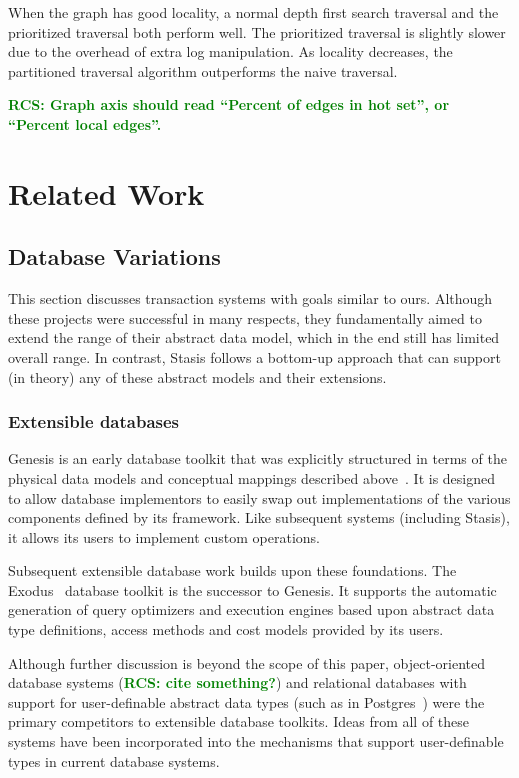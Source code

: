 \documentclass[letterpaper,twocolumn,10pt]{article}
\newcommand{\yad}{Stasis\xspace}
\newcommand{\rcs}[1]{\textcolor{green}{\bf RCS: #1}}
\begin{document}
When the graph has good locality, a normal depth first search
traversal and the prioritized traversal both perform well.  The
prioritized traversal is slightly slower due to the overhead of extra
log manipulation. As locality decreases, the partitioned traversal
algorithm outperforms the naive traversal.

\rcs{Graph axis should read ``Percent of edges in hot set'', or
``Percent local edges''.}

\section{Related Work}
\label{related-work}

\subsection{Database Variations} 
\label{sec:otherDBs}

This section discusses transaction systems with goals
similar to ours.  Although these projects were successful in many
respects, they fundamentally aimed to extend the range of their
abstract data model, which in the end still has limited overall range.
In contrast, \yad follows a bottom-up approach that can support (in 
theory) any of these abstract models and their extensions.

\subsubsection{Extensible databases}

Genesis is an early database toolkit that was explicitly
structured in terms of the physical data models and conceptual 
mappings described above~\cite{genesis}.
It is designed to allow database implementors to easily swap out
implementations of the various components defined by its framework.
Like subsequent systems (including \yad), it allows its users to
implement custom operations.

Subsequent extensible database work builds upon these foundations.
The Exodus~\cite{exodus} database toolkit is the successor to
Genesis. It supports the automatic generation of query optimizers and
execution engines based upon abstract data type definitions, access
methods and cost models provided by its users.

Although further discussion is beyond the scope of this paper,
object-oriented database systems (\rcs{cite something?}) and relational databases with
support for user-definable abstract data types (such as in
Postgres~\cite{postgres}) were the primary competitors to extensible
database toolkits.  Ideas from all of these systems have been
incorporated into the mechanisms that support user-definable types in
current database systems.
\end{document}
